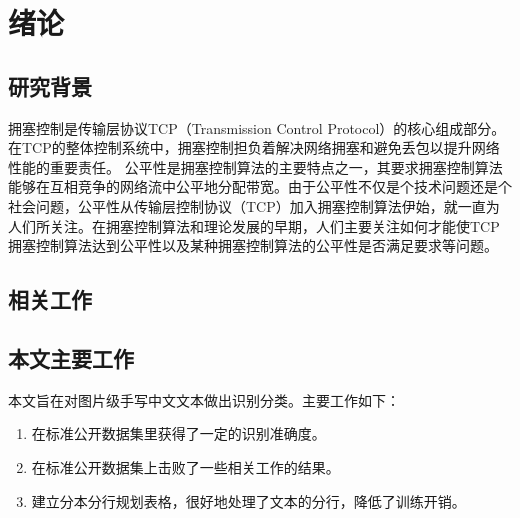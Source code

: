 \documentclass[winfonts]{njuthesis}
\begin{document}


\mainmatter

\chapter{绪论}\label{chapter:introduction}
\section{研究背景}
拥塞控制是传输层协议TCP（Transmission Control Protocol）的核心组成部分。在TCP的整体控制系统中，拥塞控制担负着解决网络拥塞和避免丢包以提升网络性能的重要责任\cite{jacobson1988congestion}。
公平性是拥塞控制算法的主要特点之一，其要求拥塞控制算法能够在互相竞争的网络流中公平地分配带宽。由于公平性不仅是个技术问题还是个社会问题，公平性从传输层控制协议（TCP）加入拥塞控制算法伊始，就一直为人们所关注。在拥塞控制算法和理论发展的早期，人们主要关注如何才能使TCP拥塞控制算法达到公平性以及某种拥塞控制算法的公平性是否满足要求等问题\cite{chiu1989analysis}\cite{kelly1998rate}\cite{hasegawa1999fairness}。

\section{相关工作}


\section{本文主要工作}
本文旨在对图片级手写中文文本做出识别分类。主要工作如下：
\begin{enumerate}
\item 在标准公开数据集里获得了一定的识别准确度。

\item 在标准公开数据集上击败了一些相关工作的结果。

\item 建立分本分行规划表格，很好地处理了文本的分行，降低了训练开销。

\end{enumerate}
\end{document}
